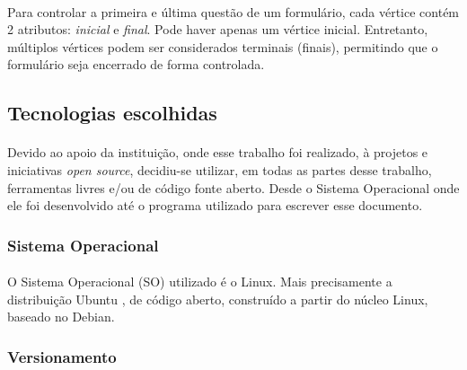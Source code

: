 \documentclass[11pt]{article}
\begin{document}
        \paragraph{}
        
        Para controlar a primeira e última questão de um formulário, cada
        vértice contém 2 atributos: {\em inicial} e {\em final}. Pode haver
        apenas um vértice inicial. Entretanto, múltiplos vértices podem ser
        considerados terminais (finais), permitindo que o formulário seja 
        encerrado de forma controlada.
        
      \subsection{Tecnologias escolhidas}
        
        \paragraph{}
        
        Devido ao apoio da instituição, onde esse trabalho foi realizado,
        à projetos e iniciativas {\em open source}, decidiu-se utilizar,
        em todas as partes desse trabalho, ferramentas livres e/ou de código fonte aberto.
        Desde o Sistema Operacional onde ele foi desenvolvido até
        o programa utilizado para escrever esse documento.
        
        \subsubsection{Sistema Operacional}

          \paragraph{}
          
          O Sistema Operacional (SO) utilizado é o Linux. Mais 
          precisamente a distribuição Ubuntu \cite{website:ubuntu}, de código aberto, 
          construído a partir do núcleo Linux, baseado no Debian.
          
        \subsubsection{Versionamento}

          \paragraph{}
          
\end{document}
